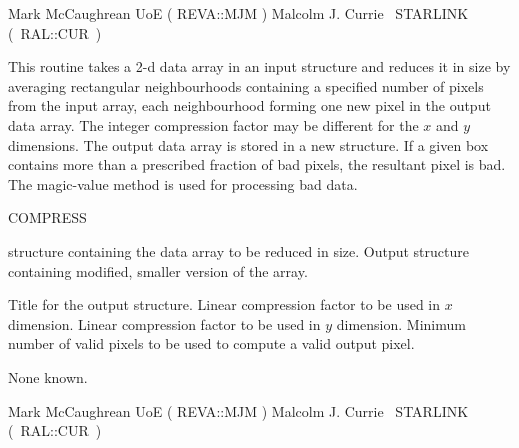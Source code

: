 {\begin{manroutinedescription}
  Mark McCaughrean UoE ( {\mantt REVA}::{\mantt MJM} )
  Malcolm J. Currie ~STARLINK \mbox{( {\mantt RAL}::{\mantt CUR} )}
\end{manroutinedescription}

\begin{manroutinedescription}
  This routine takes a 2-d data array in an input {} structure
  and reduces it in size by averaging rectangular neighbourhoods
  containing a specified number of pixels from the input array,
  each neighbourhood forming one new pixel in the output data array.
  The integer compression factor may be different for the {$x$} and {$y$}
  dimensions. The output data array is stored in a new {}
  structure. If a given box contains more than a prescribed fraction
  of bad pixels, the resultant pixel is bad.  The magic-value method
  is used for processing bad data.

  COMPRESS

\begin{manparametertable}
  {} structure containing the data array to be reduced in
  size.
  Output {} structure containing modified, smaller version
  of the array.
\end{manparametertable}
\begin{manparametertable}
  Title for the output {} structure. \mbox{}
  Linear compression factor to be used in {$x$} dimension.
  Linear compression factor to be used in {$y$} dimension.
  Minimum number of valid pixels to be used to compute a valid
  output pixel. \mbox{}
\end{manparametertable}
  None known.

  Mark McCaughrean UoE ( {\mantt REVA}::{\mantt MJM} )
  Malcolm J. Currie ~STARLINK \mbox{( {\mantt RAL}::{\mantt CUR} )}
\end{manroutinedescription}

}
